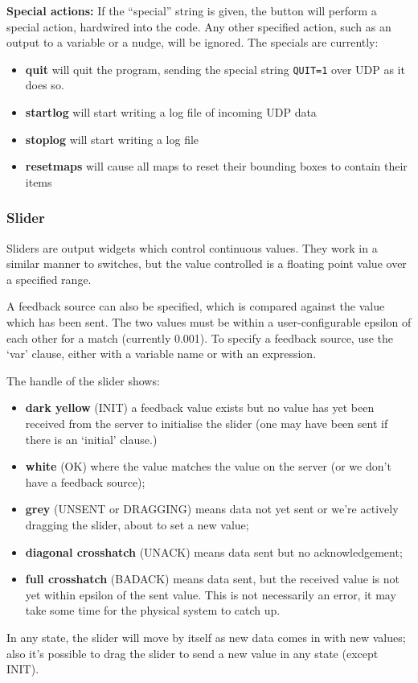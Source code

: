 \textbf{Special actions:} If the ``special'' string is given, the button will
perform a special action, hardwired into the code. Any other specified action,
such as an output to a variable or a nudge, will be ignored. The specials are
currently:
\begin{itemize}
\item \textbf{quit} will quit the program, sending the special string
\texttt{QUIT=1} over UDP as it does so.
\item \textbf{startlog} will start writing a log file of incoming UDP data
\item \textbf{stoplog} will start writing a log file
\item \textbf{resetmaps} will cause all maps to reset their bounding boxes to contain their items
\end{itemize}


\subsubsection{Slider}
Sliders are output widgets which control continuous values. They
work in a similar manner to switches, but the value controlled
is a floating point value over a specified range.

A feedback source can also be specified, which is compared against
the value which has been sent. The two values must be within
a user-configurable epsilon of each other for a match (currently 0.001).
To specify a feedback source, use the `var' clause, either with a variable name
or with an expression.

The handle of the slider shows:
\begin{itemize}
\item \textbf{dark yellow} (INIT) a feedback value exists but no value has yet been received
from the server to initialise the slider (one may have been sent if there is an `initial'
clause.)
\item \textbf{white} (OK) where the value matches the value on the server (or we
don't have a feedback source);
\item \textbf{grey} (UNSENT or DRAGGING) means data not yet sent or we're actively
dragging the slider, about to set a new value;
\item \textbf{diagonal crosshatch} (UNACK) means data sent but no acknowledgement;
\item \textbf{full crosshatch} (BADACK) means data sent, but the received value is not
yet within epsilon of the sent value. This is not necessarily an error,
it may take some time for the physical system to catch up.
\end{itemize}
In any state, the slider will move by itself as new data comes in with new values; also it's possible
to drag the slider to send a new value in any state (except INIT).

